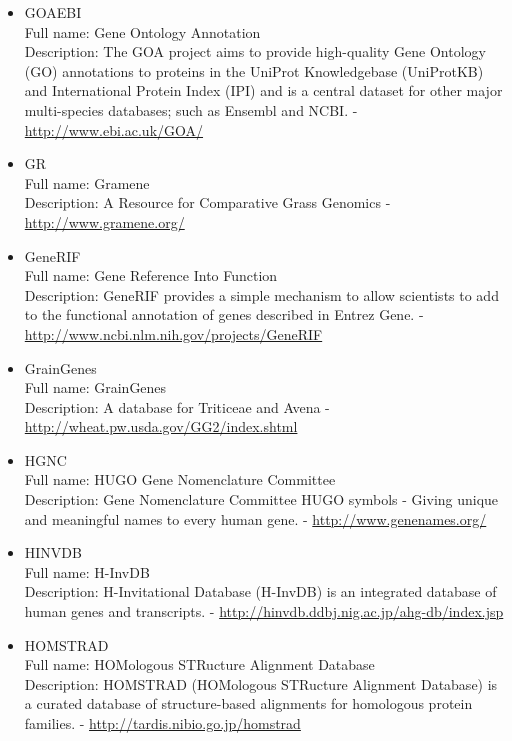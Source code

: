 \begin{itemize}
\item{GOAEBI}\\ Full name: Gene Ontology Annotation\\ Description: The GOA project aims to provide high-quality Gene Ontology (GO) annotations to proteins in the UniProt Knowledgebase (UniProtKB) and International Protein Index (IPI) and is a central dataset for other major multi-species databases; such as Ensembl and NCBI. - 
\url{http://www.ebi.ac.uk/GOA/}

\item{GR}\\ Full name: Gramene\\ Description: A Resource for Comparative Grass Genomics - 
\url{http://www.gramene.org/}

\item{GeneRIF}\\ Full name: Gene Reference Into Function\\ Description: GeneRIF provides a simple mechanism to allow scientists to add to the functional annotation of genes described in Entrez Gene. - 
\url{http://www.ncbi.nlm.nih.gov/projects/GeneRIF}

\item{GrainGenes}\\ Full name: GrainGenes\\ Description: A database for Triticeae and Avena - 
\url{http://wheat.pw.usda.gov/GG2/index.shtml}

\item{HGNC}\\ Full name: HUGO Gene Nomenclature Committee\\ Description: Gene Nomenclature Committee HUGO symbols - Giving unique and meaningful names to every human gene. - 
\url{http://www.genenames.org/}

\item{HINVDB}\\ Full name: H-InvDB\\ Description: H-Invitational Database (H-InvDB) is an integrated database of human genes and transcripts. - 
\url{http://hinvdb.ddbj.nig.ac.jp/ahg-db/index.jsp}

\item{HOMSTRAD}\\ Full name: HOMologous STRucture Alignment Database\\ Description: HOMSTRAD (HOMologous STRucture Alignment Database) is a curated database of structure-based alignments for homologous protein families. - 
\url{http://tardis.nibio.go.jp/homstrad}


\end{itemize}
